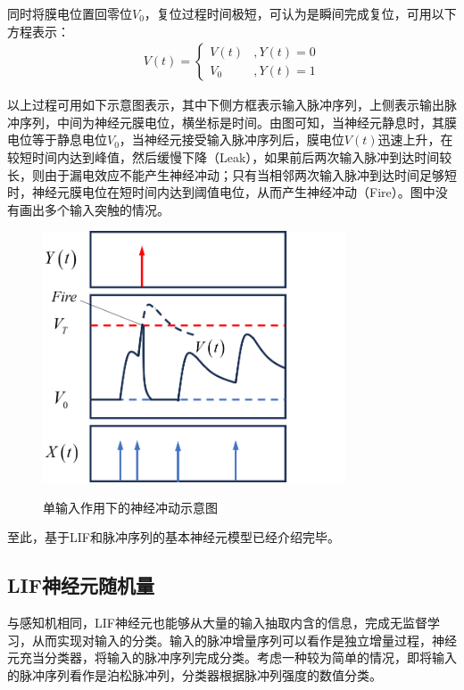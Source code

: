 \documentclass[11pt]{article}
\begin{document}
同时将膜电位置回零位$V_0$，复位过程时间极短，可认为是瞬间完成复位，可用以下方程表示：
\begin{align}
  V(t)=\left\{\begin{aligned}
                V(t) & ,Y(t)=0  \\
                V_0  & ,Y(t)= 1
              \end{aligned}\right.
  \label{eq:LIF复位过程}
\end{align}\par
以上过程可用如下示意图表示，其中下侧方框表示输入脉冲序列，上侧表示输出脉冲序列，中间为神经元膜电位，横坐标是时间。由图可知，当神经元静息时，其膜电位等于静息电位$V_0$，当神经元接受输入脉冲序列后，膜电位$V(t)$迅速上升，在较短时间内达到峰值，然后缓慢下降（Leak），如果前后两次输入脉冲到达时间较长，则由于漏电效应不能产生神经冲动；只有当相邻两次输入脉冲到达时间足够短时，神经元膜电位在短时间内达到阈值电位，从而产生神经冲动（Fire）。图中没有画出多个输入突触的情况。
\begin{figure}[H]
  \centering
  \includegraphics[width=0.8\textwidth]{神经冲动示意图.png}
  \label{fig:神经冲动示意图}
  \caption{单输入作用下的神经冲动示意图}
\end{figure}
至此，基于LIF和脉冲序列的基本神经元模型已经介绍完毕。

\subsection{LIF神经元随机量}
与感知机相同，LIF神经元也能够从大量的输入抽取内含的信息，完成无监督学习，从而实现对输入的分类。输入的脉冲增量序列可以看作是独立增量过程，神经元充当分类器，将输入的脉冲序列完成分类。考虑一种较为简单的情况，即将输入的脉冲序列看作是泊松脉冲列\cite{ZhouYinQingSuiJiGuoChengLiLun2013,nesslerSTDPEnablesSpiking2009}，分类器根据脉冲列强度的数值分类。\par
\end{document}
